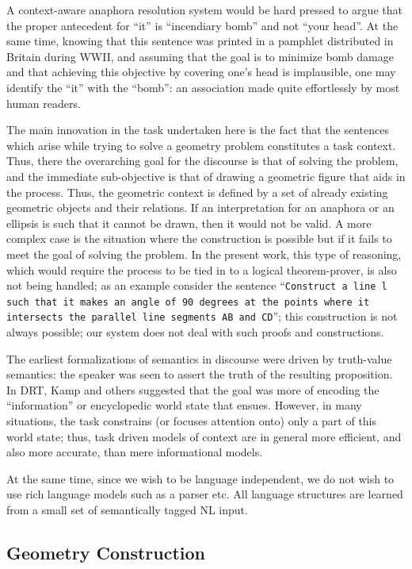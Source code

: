 \def\DevnagVersion{2.15}\documentclass[12pt]{article}
\begin{document}
A context-aware anaphora resolution system would be hard pressed to argue that the proper antecedent for ``it'' is ``incendiary bomb'' and not ``your head''. At the same time, knowing that this sentence was printed in a pamphlet distributed in Britain during WWII, and assuming that the goal is to minimize bomb damage and that achieving this objective by covering one's head is implausible, one may identify the ``it'' with the ``bomb'': an association made quite effortlessly by most human readers.

The main innovation in the task undertaken here is the fact that the sentences which arise while trying to solve a geometry problem constitutes a task context. Thus, there the overarching goal for the discourse is that of solving the problem, and the immediate sub-objective is that of drawing a geometric figure that aids in the process. Thus, the geometric context is defined by a set of already existing geometric objects and their relations. If an interpretation for an anaphora or an ellipsis is such that it cannot be drawn, then it would not be valid. A more complex case is the situation where the construction is possible but if it fails to meet the goal of solving the problem. In the present work, this type of reasoning, which would require the process to be tied in to a logical theorem-prover, is also not being handled; as an example consider the sentence ``\texttt{Construct a line l such that it makes an angle of 90 degrees at the points where it intersects the parallel line segments AB and CD}''; this construction is not always possible; our system does not deal with such proofs and constructions.

The earliest formalizations of semantics in discourse were driven by truth-value semantics: the speaker was seen to assert the truth of the resulting proposition. In DRT, Kamp and others suggested that the goal was more of encoding the ``information'' or encyclopedic world state that ensues. However, in many situations, the task constrains (or focuses attention onto) only a part of this world state; thus, task driven models of context are in general more efficient, and also more accurate, than mere informational models.

At the same time, since we wish to be language independent, we do not wish to use rich language models such as a parser etc. All language structures are learned from a small set of semantically tagged NL input.

\subsection{Geometry Construction}
\end{document}

